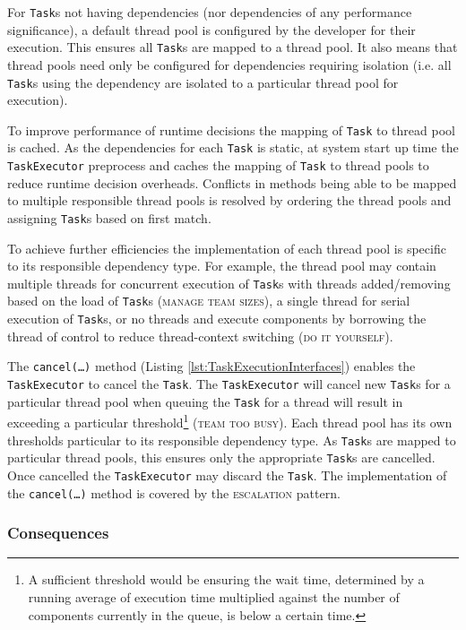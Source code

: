 \documentclass[prodmode]{style/acmlarge}
\begin{document}
For \texttt{Task}s not having dependencies (nor dependencies of any performance
significance), a default thread pool is configured by the developer for their
execution.  This ensures all \texttt{Task}s are mapped to a thread pool.  It
also means that thread pools need only be configured for dependencies requiring
isolation (i.e. all \texttt{Task}s using the dependency are isolated to a
particular thread pool for execution).

To improve performance of runtime decisions the mapping of \texttt{Task} to
thread pool is cached.  As the dependencies for each \texttt{Task} is static, at
system start up time the \texttt{TaskExecutor} preprocess and caches the mapping
of \texttt{Task} to thread pools to reduce runtime decision overheads. 
Conflicts in methods being able to be mapped to multiple responsible thread
pools is resolved by ordering the thread pools and assigning \texttt{Task}s
based on first match.

To achieve further efficiencies the implementation of each thread pool is
specific to its responsible dependency type.  For example, the thread pool may
contain multiple threads for concurrent execution of \texttt{Task}s with threads
added/removing based on the load of \texttt{Task}s (\textsc{manage team sizes}),
a single thread for serial execution of \texttt{Task}s, or no threads and
execute components by borrowing the thread of control to reduce thread-context
switching (\textsc{do it yourself}).

The \texttt{cancel(\ldots)} method (Listing \ref{lst:TaskExecutionInterfaces})
enables the \texttt{TaskExecutor} to cancel the \texttt{Task}. The
\texttt{Task\-Executor} will cancel new \texttt{Task}s for a particular thread
pool when queuing the \texttt{Task} for a thread will result in exceeding a
particular threshold\footnote{A sufficient threshold would be ensuring the wait
time, determined by a running average of execution time multiplied against the
number of components currently in the queue, is below a certain time.}
(\textsc{team too busy}).  Each thread pool has its own thresholds particular to
its responsible dependency type.  As \texttt{Task}s are mapped to particular
thread pools, this ensures only the appropriate \texttt{Task}s are cancelled.
Once cancelled the \texttt{TaskExecutor} may discard the \texttt{Task}.  The
implementation of the \texttt{can\-cel(\ldots)} method is covered by the
\textsc{escalation} pattern.


\subsubsection*{Consequences}
\end{document}
